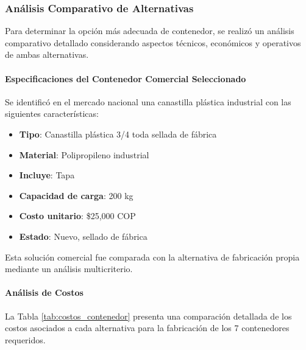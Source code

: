 \subsubsection{Análisis Comparativo de Alternativas}

Para determinar la opción más adecuada de contenedor, se realizó un análisis comparativo detallado considerando aspectos técnicos, económicos y operativos de ambas alternativas.

\paragraph{Especificaciones del Contenedor Comercial Seleccionado}

Se identificó en el mercado nacional una canastilla plástica industrial con las siguientes características:

\begin{itemize}
    \item \textbf{Tipo}: Canastilla plástica 3/4 toda sellada de fábrica
    \item \textbf{Material}: Polipropileno industrial
    \item \textbf{Incluye}: Tapa
    \item \textbf{Capacidad de carga}: 200 kg
    \item \textbf{Costo unitario}: \$25,000 COP
    \item \textbf{Estado}: Nuevo, sellado de fábrica
\end{itemize}

Esta solución comercial fue comparada con la alternativa de fabricación propia mediante un análisis multicriterio.

\paragraph{Análisis de Costos}

La Tabla \ref{tab:costos_contenedor} presenta una comparación detallada de los costos asociados a cada alternativa para la fabricación de los 7 contenedores requeridos.

